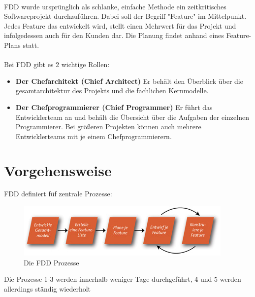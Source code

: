 \documentclass[a4paper, twopage]{scrreprt}
\begin{document}
\paragraph*{}
FDD wurde ursprünglich als schlanke, einfache Methode ein zeitkritisches Softwareprojekt durchzuführen. Dabei soll der Begriff "Feature" im Mittelpunkt. Jedes Feature das entwickelt wird, stellt einen Mehrwert für das Projekt und infolgedessen auch für den Kunden dar. 
Die Planung findet anhand eines Feature-Plans statt. 
\paragraph*{}
Bei FDD gibt es 2 wichtige Rollen:
\begin{itemize}
	\item \textbf{Der Chefarchitekt (Chief Architect)} \newline
		Er behält den Überblick über die gesamtarchitektur des Projekts und die fachlichen Kernmodelle.
	\item \textbf{Der Chefprogrammierer (Chief Programmer)} \newline
		Er führt das Entwicklerteam an und behält die Übersicht über die Aufgaben der einzelnen Programmierer. Bei größeren Projekten können auch mehrere Entwicklerteams mit je einem Chefprogrammierern.
\end{itemize}
\section{Vorgehensweise}
FDD definiert füf zentrale Prozesse:
\begin{figure}[h]
\centering
	\includegraphics[scale=1]{Images/fdd_prozesse}
	\caption[FDD-Prozesse]{Die FDD Prozesse\cite{wikipedia:fdd}}
	\label{fig:fdd}
\end{figure}
Die Prozesse 1-3 werden innerhalb weniger Tage durchgeführt, 4 und 5 werden allerdings ständig wiederholt

\end{document}
